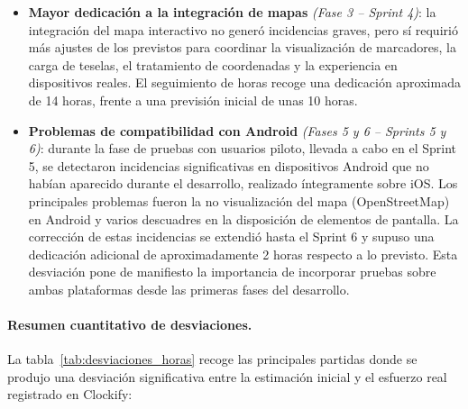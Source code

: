 \begin{itemize}
    \item \textbf{Mayor dedicación a la integración de mapas} \textit{(Fase 3 – Sprint 4)}: la integración del mapa interactivo no generó incidencias graves, pero sí requirió más ajustes de los previstos para coordinar la visualización de marcadores, la carga de teselas, el tratamiento de coordenadas y la experiencia en dispositivos reales. El seguimiento de horas recoge una dedicación aproximada de 14 horas, frente a una previsión inicial de unas 10 horas.

    \item \textbf{Problemas de compatibilidad con Android} \textit{(Fases 5 y 6 – Sprints 5 y 6)}: durante la fase de pruebas con usuarios piloto, llevada a cabo en el Sprint 5, se detectaron incidencias significativas en dispositivos Android que no habían aparecido durante el desarrollo, realizado íntegramente sobre iOS. Los principales problemas fueron la no visualización del mapa (OpenStreetMap) en Android y varios descuadres en la disposición de elementos de pantalla. La corrección de estas incidencias se extendió hasta el Sprint 6 y supuso una dedicación adicional de aproximadamente 2 horas respecto a lo previsto. Esta desviación pone de manifiesto la importancia de incorporar pruebas sobre ambas plataformas desde las primeras fases del desarrollo.
\end{itemize}

\paragraph{Resumen cuantitativo de desviaciones.}

La tabla~\ref{tab:desviaciones_horas} recoge las principales partidas donde se produjo una desviación significativa entre la estimación inicial y el esfuerzo real registrado en Clockify:

